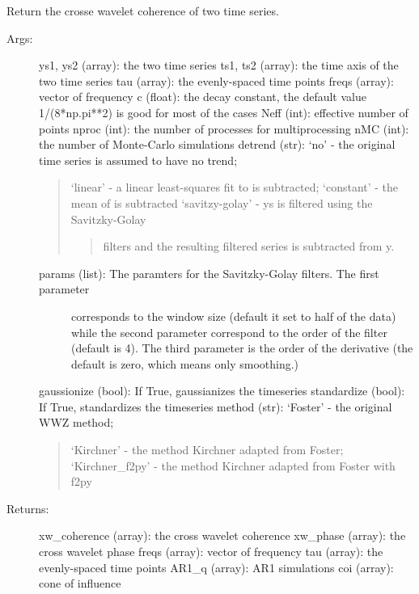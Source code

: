 \documentclass[letterpaper,10pt,english]{sphinxmanual}
\begin{document}

\begin{fulllineitems}
\label{\detokenize{Spectral:pyleoclim.Spectral.xwc}}
Return the crosse wavelet coherence of two time series.
\begin{description}
\item[{Args:}] \leavevmode
ys1, ys2 (array): the two time series
ts1, ts2 (array): the time axis of the two time series
tau (array): the evenly-spaced time points
freqs (array): vector of frequency
c (float): the decay constant, the default value 1/(8*np.pi**2) is good for most of the cases
Neff (int): effective number of points
nproc (int): the number of processes for multiprocessing
nMC (int): the number of Monte-Carlo simulations
detrend (str): ‘no’ - the original time series is assumed to have no trend;
\begin{quote}

‘linear’ - a linear least-squares fit to  is subtracted;
‘constant’ - the mean of  is subtracted
‘savitzy-golay’ - ys is filtered using the Savitzky-Golay
\begin{quote}

filters and the resulting filtered series is subtracted from y.
\end{quote}
\end{quote}
\begin{description}
\item[{params (list): The paramters for the Savitzky-Golay filters. The first parameter}] \leavevmode
corresponds to the window size (default it set to half of the data)
while the second parameter correspond to the order of the filter
(default is 4). The third parameter is the order of the derivative
(the default is zero, which means only smoothing.)

\end{description}

gaussionize (bool): If True, gaussianizes the timeseries
standardize (bool): If True, standardizes the timeseries
method (str): ‘Foster’ - the original WWZ method;
\begin{quote}

‘Kirchner’ - the method Kirchner adapted from Foster;
‘Kirchner\_f2py’ - the method Kirchner adapted from Foster with f2py
\end{quote}

\item[{Returns:}] \leavevmode
xw\_coherence (array): the cross wavelet coherence
xw\_phase (array): the cross wavelet phase
freqs (array): vector of frequency
tau (array): the evenly-spaced time points
AR1\_q (array): AR1 simulations
coi (array): cone of influence

\end{description}

\end{fulllineitems}
\end{document}
